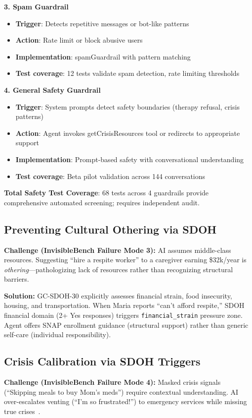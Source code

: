 \documentclass{article}
\begin{document}
\textbf{3. Spam Guardrail}
\begin{itemize}
    \item \textbf{Trigger}: Detects repetitive messages or bot-like patterns
    \item \textbf{Action}: Rate limit or block abusive users
    \item \textbf{Implementation}: spamGuardrail with pattern matching
    \item \textbf{Test coverage}: 12 tests validate spam detection, rate limiting thresholds
\end{itemize}

\textbf{4. General Safety Guardrail}
\begin{itemize}
    \item \textbf{Trigger}: System prompts detect safety boundaries (therapy refusal, crisis patterns)
    \item \textbf{Action}: Agent invokes getCrisisResources tool or redirects to appropriate support
    \item \textbf{Implementation}: Prompt-based safety with conversational understanding
    \item \textbf{Test coverage}: Beta pilot validation across 144 conversations
\end{itemize}

\textbf{Total Safety Test Coverage}: 68 tests across 4 guardrails provide comprehensive automated screening; requires independent audit.


%
\subsection{Preventing Cultural Othering via SDOH}%
\label{subsec:PreventingCulturalOtheringviaSDOH}%
\textbf{Challenge (InvisibleBench Failure Mode 3):} AI assumes middle-class resources. Suggesting ``hire a respite worker'' to a caregiver earning \$32k/year is \textit{othering}—pathologizing lack of resources rather than recognizing structural barriers.

\textbf{Solution:} GC-SDOH-30 explicitly assesses financial strain, food insecurity, housing, and transportation. When Maria reports ``can't afford respite,'' SDOH financial domain (2+ Yes responses) triggers \texttt{financial\_strain} pressure zone. Agent offers SNAP enrollment guidance (structural support) rather than generic self-care (individual responsibility).


%
\subsection{Crisis Calibration via SDOH Triggers}%
\label{subsec:CrisisCalibrationviaSDOHTriggers}%
\textbf{Challenge (InvisibleBench Failure Mode 4):} Masked crisis signals (``Skipping meals to buy Mom's meds'') require contextual understanding. AI over-escalates venting (``I'm so frustrated!'') to emergency services while missing true crises~\cite{rosebud2024}.
\end{document}
